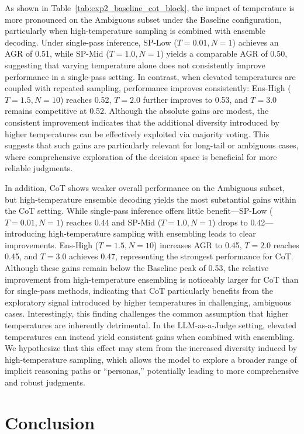 \documentclass[11pt]{article}
\begin{document}
As shown in Table~\ref{tab:exp2_baseline_cot_block}, the impact of temperature is more pronounced on the Ambiguous subset under the Baseline configuration, particularly when high-temperature sampling is combined with ensemble decoding. Under single-pass inference, SP-Low (\(T=0.01, N=1\)) achieves an AGR of 0.51, while SP-Mid (\(T=1.0, N=1\)) yields a comparable AGR of 0.50, suggesting that varying temperature alone does not consistently improve performance in a single-pass setting. In contrast, when elevated temperatures are coupled with repeated sampling, performance improves consistently: Ens-High (\(T=1.5, N=10\)) reaches 0.52, \(T=2.0\) further improves to 0.53, and \(T=3.0\) remains competitive at 0.52. Although the absolute gains are modest, the consistent improvement indicates that the additional diversity introduced by higher temperatures can be effectively exploited via majority voting. This suggests that such gains are particularly relevant for long-tail or ambiguous cases, where comprehensive exploration of the decision space is beneficial for more reliable judgments.

In addition, CoT shows weaker overall performance on the Ambiguous subset, but high-temperature ensemble decoding yields the most substantial gains within the CoT setting. While single-pass inference offers little benefit—SP-Low (\(T=0.01, N=1\)) reaches 0.44 and SP-Mid (\(T=1.0, N=1\)) drops to 0.42—introducing high-temperature sampling with ensembling leads to clear improvements. Ens-High (\(T=1.5, N=10\)) increases AGR to 0.45, \(T=2.0\) reaches 0.45, and \(T=3.0\) achieves 0.47, representing the strongest performance for CoT. Although these gains remain below the Baseline peak of 0.53, the relative improvement from high-temperature ensembling is noticeably larger for CoT than for single-pass methods, indicating that CoT particularly benefits from the exploratory signal introduced by higher temperatures in challenging, ambiguous cases. Interestingly, this finding challenges the common assumption that higher temperatures are inherently detrimental. In the LLM-as-a-Judge setting, elevated temperatures can instead yield consistent gains when combined with ensembling. We hypothesize that this effect may stem from the increased diversity induced by high-temperature sampling, which allows the model to explore a broader range of implicit reasoning paths or “personas,” potentially leading to more comprehensive and robust judgments.


\section{Conclusion}
\end{document}

